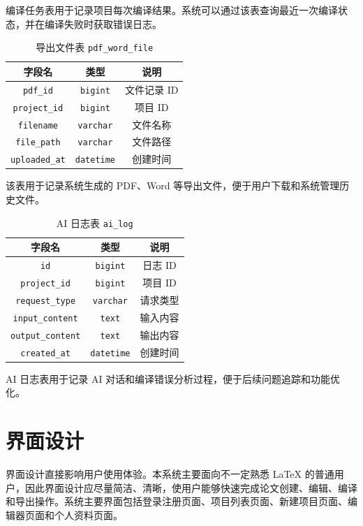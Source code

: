 \documentclass{xduugthesis}
\begin{document}
编译任务表用于记录项目每次编译结果。系统可以通过该表查询最近一次编译状态，并在编译失败时获取错误日志。

\begin{table}[!ht]
    \centering
    \caption{导出文件表 \texttt{pdf\_word\_file}}
    \label{tab:pdf-word-file}
    \begin{tabular}{|c|c|c|}
        \hline
        \textbf{字段名} & \textbf{类型} & \textbf{说明} \\ \hline
        \texttt{pdf\_id} & \texttt{bigint} & 文件记录 ID \\ \hline
        \texttt{project\_id} & \texttt{bigint} & 项目 ID \\ \hline
        \texttt{filename} & \texttt{varchar} & 文件名称 \\ \hline
        \texttt{file\_path} & \texttt{varchar} & 文件路径 \\ \hline
        \texttt{uploaded\_at} & \texttt{datetime} & 创建时间 \\ \hline
    \end{tabular}
\end{table}

该表用于记录系统生成的 PDF、Word 等导出文件，便于用户下载和系统管理历史文件。

\begin{table}[!ht]
    \centering
    \caption{AI 日志表 \texttt{ai\_log}}
    \label{tab:ai-log}
    \begin{tabular}{|c|c|c|}
        \hline
        \textbf{字段名} & \textbf{类型} & \textbf{说明} \\ \hline
        \texttt{id} & \texttt{bigint} & 日志 ID \\ \hline
        \texttt{project\_id} & \texttt{bigint} & 项目 ID \\ \hline
        \texttt{request\_type} & \texttt{varchar} & 请求类型 \\ \hline
        \texttt{input\_content} & \texttt{text} & 输入内容 \\ \hline
        \texttt{output\_content} & \texttt{text} & 输出内容 \\ \hline
        \texttt{created\_at} & \texttt{datetime} & 创建时间 \\ \hline
    \end{tabular}
\end{table}

AI 日志表用于记录 AI 对话和编译错误分析过程，便于后续问题追踪和功能优化。

\section{界面设计}
界面设计直接影响用户使用体验。本系统主要面向不一定熟悉 LaTeX 的普通用户，因此界面设计应尽量简洁、清晰，使用户能够快速完成论文创建、编辑、编译和导出操作。系统主要界面包括登录注册页面、项目列表页面、新建项目页面、编辑器页面和个人资料页面。
\end{document}
